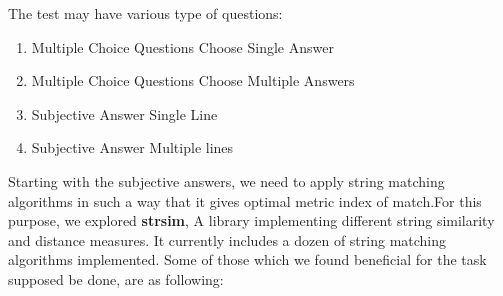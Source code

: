 The test may have various type of questions:
\begin{enumerate}
    \item Multiple Choice Questions Choose Single Answer
    \item Multiple Choice Questions Choose Multiple Answers
    \item Subjective Answer Single Line
    \item Subjective Answer Multiple lines
\end{enumerate}

Starting with the subjective answers, we need to apply string matching algorithms in such a way that it gives optimal metric index of match.For this purpose, we explored \textbf{strsim}, A library implementing different string similarity and distance measures. It currently includes a dozen of string matching algorithms implemented.\cite{strsim} Some of those which we found beneficial for the task supposed be done, are as following:
